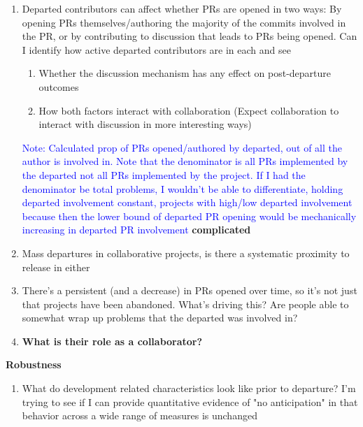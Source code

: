 \documentclass[12pt,notitlepage]{article}
\begin{document}
\begin{enumerate}
    \item Departed contributors can affect whether PRs are opened in two ways: By opening PRs themselves/authoring the majority of the commits involved in the PR, or by contributing to discussion that leads to PRs being opened. Can I identify how active departed contributors are in each and see
    \begin{enumerate}
        \item Whether the discussion mechanism has any effect on post-departure outcomes
        \item How both factors interact with collaboration (Expect collaboration to interact with discussion in more interesting ways)
    \end{enumerate}
    \textcolor{blue}{Note: Calculated prop of PRs opened/authored by departed, out of all the author is involved in. Note that the denominator is all PRs implemented by the departed not all PRs implemented by the project. If I had the denominator be total problems, I wouldn't be able to differentiate, holding departed involvement constant, projects with high/low departed involvement because then the lower bound of departed PR opening would be mechanically increasing in departed PR involvement}
    \textbf{complicated}
    

    \item Mass departures in collaborative projects, is there a systematic proximity to release in either

    \item There's a persistent (and a decrease) in PRs opened over time, so it's not just that projects have been abandoned. What's driving this? Are people able to somewhat wrap up problems that the departed was involved in?
    \item \textbf{What is their role as a collaborator?}
    
\end{enumerate}

\textbf{Robustness}
\begin{enumerate}
    \item What do development related characteristics look like prior to departure? I'm trying to see if I can provide quantitative evidence of "no anticipation" in that behavior across a wide range of measures is unchanged
\end{enumerate}
\end{document}
